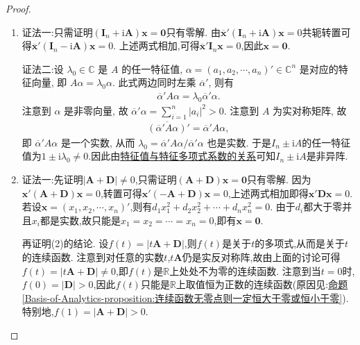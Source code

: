 \documentclass[../../main.tex]{subfiles}%
\begin{document}
\begin{proof}
\begin{enumerate}[(1)]
\item {\color{blue}证法一:}只需证明\((\boldsymbol{I}_n + \mathrm{i}\boldsymbol{A})\boldsymbol{x}=\boldsymbol{0}\)只有零解. 由\(\overline{\boldsymbol{x}}'(\boldsymbol{I}_n + \mathrm{i}\boldsymbol{A})\boldsymbol{x}=0\)共轭转置可得\(\overline{\boldsymbol{x}}'(\boldsymbol{I}_n - \mathrm{i}\boldsymbol{A})\boldsymbol{x}=0\). 上述两式相加,可得\(\overline{\boldsymbol{x}}'\boldsymbol{I}_n\boldsymbol{x}=0\),因此\(\boldsymbol{x}=\boldsymbol{0}\).

{\color{blue}证法二:}设 $\lambda_0 \in \mathbb{C}$ 是 $A$ 的任一特征值, $\alpha = (a_1, a_2, \cdots, a_n)' \in \mathbb{C}^n$ 是对应的特征向量, 即 $A\alpha = \lambda_0 \alpha$. 此式两边同时左乘 $\overline{\alpha }' $, 则有
\begin{align*}
\overline{\alpha }'  A \alpha = \lambda_0 \overline{\alpha }'  \alpha.
\end{align*}
注意到 $\alpha$ 是非零向量, 故 $\overline{\alpha }' \alpha = \sum_{i=1}^n |a_i|^2 > 0$. 注意到 $A$ 为实对称矩阵, 故
\begin{align*}
\overline{(\overline{\alpha }'  A\alpha )}' = \overline{\alpha }' A \alpha,
\end{align*}
即 $\overline{\alpha }'  A \alpha$ 是一个实数, 从而 $\lambda_0 = \overline{\alpha }'  A \alpha / \overline{\alpha }'  \alpha$ 也是实数. 于是$I_n\pm \mathrm{i}A$的任一特征值为$1\pm \mathrm{i}\lambda_0\ne 0$.因此由\hyperref[proposition:特征值与特征多项式系数的关系]{特征值与特征多项式系数的关系}可知$I_n\pm \mathrm{i}A$是非异阵.

\item {\color{blue}证法一:}先证明\(|\boldsymbol{A}+\boldsymbol{D}|\neq0\),只需证明\((\boldsymbol{A}+\boldsymbol{D})\boldsymbol{x}=\boldsymbol{0}\)只有零解. 因为\(\boldsymbol{x}'(\boldsymbol{A}+\boldsymbol{D})\boldsymbol{x}=0\),转置可得\(\boldsymbol{x}'(-\boldsymbol{A}+\boldsymbol{D})\boldsymbol{x}=0\),上述两式相加即得\(\boldsymbol{x}'\boldsymbol{D}\boldsymbol{x}=0\). 若设\(\boldsymbol{x}=(x_1,x_2,\cdots,x_n)'\),则有\(d_1x_1^2 + d_2x_2^2+\cdots + d_nx_n^2 = 0\). 由于\(d_i\)都大于零并且\(x_i\)都是实数,故只能是\(x_1 = x_2=\cdots = x_n = 0\),即有\(\boldsymbol{x}=\boldsymbol{0}\).

再证明(2)的结论. 设\(f(t)=|t\boldsymbol{A}+\boldsymbol{D}|\),则\(f(t)\)是关于\(t\)的多项式,从而是关于\(t\)的连续函数. 注意到对任意的实数\(t\),\(t\boldsymbol{A}\)仍是实反对称阵,故由上面的讨论可得\(f(t)=|t\boldsymbol{A}+\boldsymbol{D}|\neq0\),即\(f(t)\)是\(\mathbb{R}\)上处处不为零的连续函数. 注意到当\(t = 0\)时,\(f(0)=|\boldsymbol{D}|>0\),因此\(f(t)\)只能是\(\mathbb{R}\)上取值恒为正数的连续函数(原因见:\hyperref[Basis-of-Analytics-proposition:连续函数无零点则一定恒大于零或恒小于零]{命题\ref{Basis-of-Analytics-proposition:连续函数无零点则一定恒大于零或恒小于零}}).特别地,\(f(1)=|\boldsymbol{A}+\boldsymbol{D}|>0\). 


\end{enumerate}
\end{proof}
\end{document}
